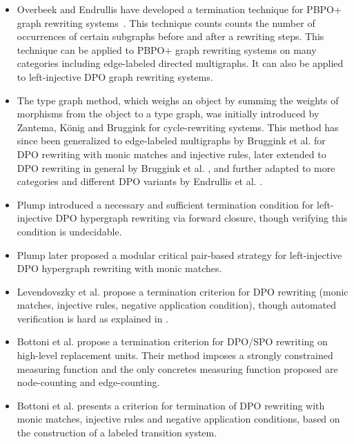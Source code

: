 \begin{itemize}
    \item Overbeek and Endrullis have developed a termination technique for PBPO+ graph rewriting systems~\cite{overbeek2024termination_lmcs}. This technique counts counts the number of occurrences of certain subgraphs before and after a rewriting steps. This technique can be applied to PBPO+ graph rewriting systems on many categories including edge-labeled directed multigraphs. It can also be applied to left-injective DPO graph rewriting systems.
    \item The type graph method, which weighs an object by summing the weights of morphisms from the object to a type graph, was initially introduced by Zantema, K{\"o}nig and Bruggink \cite{zantema2014termination} for cycle-rewriting systems. 
    This method has since been generalized to edge-labeled multigraphs by Bruggink et al. \cite{bruggink2014termination} for DPO rewriting with monic matches and injective rules, later extended to DPO rewriting in general by Bruggink et al. \cite{bruggink2015proving}, and further adapted to more categories and different DPO variants by Endrullis et al. \cite{endrullis2024generalized_arxiv_v2}. 
    \item Plump \cite{plump1995ontermination} introduced a necessary and sufficient termination condition for left-injective DPO hypergraph rewriting via forward closure, though verifying this condition is undecidable. 
    \item Plump \cite{plump2018modular} later proposed a modular critical pair-based strategy for left-injective DPO hypergraph rewriting with monic matches. 
    \item Levendovszky et al. \cite{levendovszky2007termination} propose a termination criterion for DPO rewriting (monic matches, injective rules, negative application condition), though automated verification is hard as explained in \cite[]{levendovszky2007termination}. 
    \item Bottoni et al. \cite{bottoni2005termination} propose a termination criterion for DPO/SPO rewriting on high-level replacement units. Their method imposes a strongly constrained measuring function and the only concretes measuring function proposed are node-counting and edge-counting.
    \item Bottoni et al. \cite{bottoni2010atermination} presents a criterion for termination of DPO rewriting with monic matches, injective rules and negative application conditions, based on the construction of a labeled transition system. 
\end{itemize}


